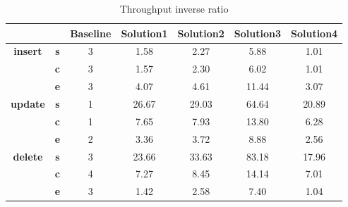 \begin{table}[h]
\centering
\caption{Throughput inverse ratio}\label{t:}
\begin{tabular}{ccccccc}
\toprule
&&\textbf{Baseline} & \textbf{Solution1} & \textbf{Solution2} & \textbf{Solution3} & \textbf{Solution4}\\
\midrule
\multirow{3}{*}{\textbf{insert}} & \textbf{s} & 3 & 1.58 & 2.27 & 5.88 & 1.01\\
 & \textbf{c} & 3 & 1.57 & 2.30 & 6.02 & 1.01\\
 & \textbf{e} & 3 & 4.07 & 4.61 & 11.44 & 3.07\\
\midrule
\multirow{3}{*}{\textbf{update}} & \textbf{s} & 1 & 26.67 & 29.03 & 64.64 & 20.89\\
 & \textbf{c} & 1 & 7.65 & 7.93 & 13.80 & 6.28\\
 & \textbf{e} & 2 & 3.36 & 3.72 & 8.88 & 2.56\\
\midrule
\multirow{3}{*}{\textbf{delete}} & \textbf{s} & 3 & 23.66 & 33.63 & 83.18 & 17.96\\
 & \textbf{c} & 4 & 7.27 & 8.45 & 14.14 & 7.01\\
 & \textbf{e} & 3 & 1.42 & 2.58 & 7.40 & 1.04\\
\bottomrule
\end{tabular}
\end{table}






